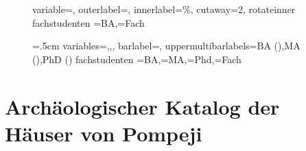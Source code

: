 \begin{figure}[h]
	\DTLpiechart%
{variable=\ba,%
outerlabel=\fach,%
innerlabel={\DTLpiepercent\%},%
cutaway={2},%
rotateinner%
}
{fachstudenten}
{\ba=BA,\fach=Fach}
\end{figure}


\begin{figure}
\DTLbarwidth=.5cm
	\DTLmultibarchart%
{variables={\ba,\ma,\phd},%
 barlabel=\fach,%
 uppermultibarlabels={BA (\ba),MA (\ma),PhD (\phd)}}
{fachstudenten}
{\ba=BA,\ma=MA,\phd=Phd,\fach=Fach}
\end{figure}



\section{Archäologischer Katalog der Häuser von Pompeji}



